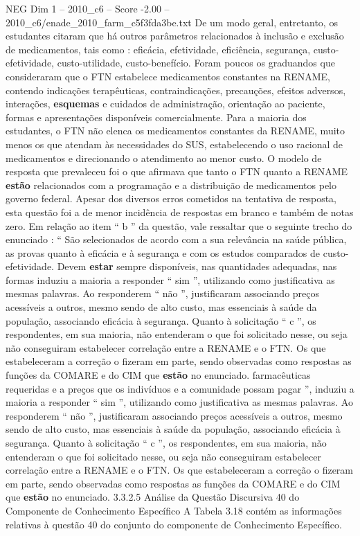 \begin{textsample}{NEG Dim 1 – 2010\_c6 – Score -2.00 – 2010\_c6/enade\_2010\_farm\_c5f3fda3be.txt}
De um modo geral, entretanto, os estudantes citaram que há outros parâmetros relacionados à inclusão e exclusão de medicamentos, tais como : eficácia, efetividade, eficiência, segurança, custo-efetividade, custo-utilidade, custo-benefício.
Foram poucos os graduandos que consideraram que o FTN estabelece medicamentos constantes na RENAME, contendo indicações terapêuticas, contraindicações, precauções, efeitos adversos, interações, \textbf{esquemas} e cuidados de administração, orientação ao paciente, formas e apresentações disponíveis comercialmente.
Para a maioria dos estudantes, o FTN não elenca os medicamentos constantes da RENAME, muito menos os que atendam às necessidades do SUS, estabelecendo o uso racional de medicamentos e direcionando o atendimento ao menor custo.
O modelo de resposta que prevaleceu foi o que afirmava que tanto o FTN quanto a RENAME \textbf{estão} relacionados com a programação e a distribuição de medicamentos pelo governo federal.
Apesar dos diversos erros cometidos na tentativa de resposta, esta questão foi a de menor incidência de respostas em branco e também de notas zero.
Em relação ao item “ b ” da questão, vale ressaltar que o seguinte trecho do enunciado : “ São selecionados de acordo com a sua relevância na saúde pública, as provas quanto à eficácia e à segurança e com os estudos comparados de custo-efetividade.
Devem \textbf{estar} sempre disponíveis, nas quantidades adequadas, nas formas induziu a maioria a responder “ sim ”, utilizando como justificativa as mesmas palavras.
Ao responderem “ não ”, justificaram associando preços acessíveis a outros, mesmo sendo de alto custo, mas essenciais à saúde da população, associando eficácia à segurança.
Quanto à solicitação “ c ”, os respondentes, em sua maioria, não entenderam o que foi solicitado nesse, ou seja não conseguiram estabelecer correlação entre a RENAME e o FTN.
Os que estabeleceram a correção o fizeram em parte, sendo observadas como respostas as funções da COMARE e do CIM que \textbf{estão} no enunciado. farmacêuticas requeridas e a preços que os indivíduos e a comunidade possam pagar ”, induziu a maioria a responder “ sim ”, utilizando como justificativa as mesmas palavras.
Ao responderem “ não ”, justificaram associando preços acessíveis a outros, mesmo sendo de alto custo, mas essenciais à saúde da população, associando eficácia à segurança.
Quanto à solicitação “ c ”, os respondentes, em sua maioria, não entenderam o que foi solicitado nesse, ou seja não conseguiram estabelecer correlação entre a RENAME e o FTN.
Os que estabeleceram a correção o fizeram em parte, sendo observadas como respostas as funções da COMARE e do CIM que \textbf{estão} no enunciado. 3.3.2.5 Análise da Questão Discursiva 40 do Componente de Conhecimento Específico A Tabela 3.18 contém as informações relativas à questão 40 do conjunto do componente de Conhecimento Específico.

\end{textsample}
